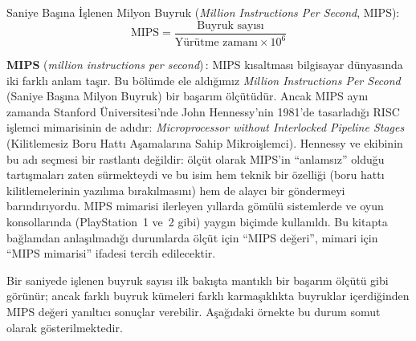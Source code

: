 Saniye Başına İşlenen Milyon Buyruk (\emph{Million Instructions Per Second}, MIPS):
\begin{equation}
\text{MIPS} = \frac{\text{Buyruk sayısı}}{\text{Yürütme zamanı} \times 10^6}
\label{eq:mips}
\end{equation}

\begin{terimnotu}
\textbf{MIPS} (\emph{million instructions per second})\,: MIPS kısaltması bilgisayar dünyasında iki farklı anlam taşır. Bu bölümde ele aldığımız \emph{Million Instructions Per Second} (Saniye Başına Milyon Buyruk) bir başarım ölçütüdür. Ancak MIPS aynı zamanda Stanford Üniversitesi'nde John Hennessy'nin 1981'de tasarladığı RISC işlemci mimarisinin de adıdır: \emph{Microprocessor without Interlocked Pipeline Stages} (Kilitlemesiz Boru Hattı Aşamalarına Sahip Mikroişlemci). Hennessy ve ekibinin bu adı seçmesi bir rastlantı değildir: ölçüt olarak MIPS'in ``anlamsız'' olduğu tartışmaları zaten sürmekteydi ve bu isim hem teknik bir özelliği (boru hattı kilitlemelerinin yazılıma bırakılmasını) hem de alaycı bir göndermeyi barındırıyordu. MIPS mimarisi ilerleyen yıllarda gömülü sistemlerde ve oyun konsollarında (PlayStation~1 ve~2 gibi) yaygın biçimde kullanıldı. Bu kitapta bağlamdan anlaşılmadığı durumlarda ölçüt için ``MIPS değeri'', mimari için ``MIPS mimarisi'' ifadesi tercih edilecektir.
\end{terimnotu}

Bir saniyede işlenen buyruk sayısı ilk bakışta mantıklı bir başarım ölçütü gibi görünür; ancak farklı buyruk kümeleri farklı karmaşıklıkta buyruklar içerdiğinden MIPS değeri yanıltıcı sonuçlar verebilir. Aşağıdaki örnekte bu durum somut olarak gösterilmektedir.


